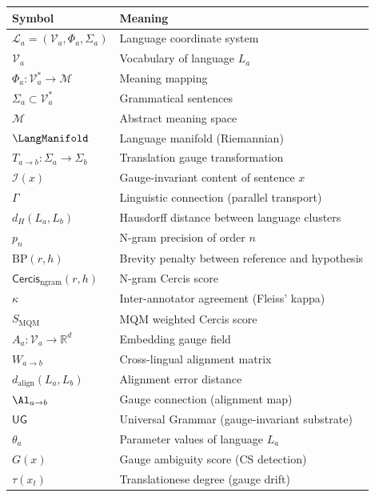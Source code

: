 \documentclass[12pt,a4paper]{article}
\theoremstyle{remark}
\newcommand{\R}{\mathbb{R}}
\newcommand{\M}{\mathcal{M}}
\newcommand{\I}{\mathcal{I}}
\newcommand{\Lang}{\mathcal{L}}
\newcommand{\Vocab}{\mathcal{V}}
\newcommand{\Cercis}{\textsf{Cercis}}
\newcommand{\UG}{\textsf{UG}}
\begin{document}
\begin{table}[H]
\centering
\begin{tabular}{@{}ll@{}}
\toprule
\textbf{Symbol} & \textbf{Meaning} \\
\midrule
$\Lang_a = (\Vocab_a, \Phi_a, \Sigma_a)$ & Language coordinate system \\
$\Vocab_a$ & Vocabulary of language $L_a$ \\
$\Phi_a: \Vocab_a^* \to \M$ & Meaning mapping \\
$\Sigma_a \subset \Vocab_a^*$ & Grammatical sentences \\
$\M$ & Abstract meaning space \\
$\LangManifold$ & Language manifold (Riemannian) \\
$T_{a\to b}: \Sigma_a \to \Sigma_b$ & Translation gauge transformation \\
$\I(x)$ & Gauge-invariant content of sentence $x$ \\
$\Gamma$ & Linguistic connection (parallel transport) \\
$d_H(L_a, L_b)$ & Hausdorff distance between language clusters \\
\midrule
$p_n$ & N-gram precision of order $n$ \\
$\text{BP}(r, h)$ & Brevity penalty between reference and hypothesis \\
$\Cercis_{\text{ngram}}(r, h)$ & N-gram Cercis score \\
$\kappa$ & Inter-annotator agreement (Fleiss' kappa) \\
$S_{\text{MQM}}$ & MQM weighted Cercis score \\
\midrule
$A_a: \Vocab_a \to \R^d$ & Embedding gauge field \\
$W_{a\to b}$ & Cross-lingual alignment matrix \\
$d_{\text{align}}(L_a, L_b)$ & Alignment error distance \\
$\Al_{a\to b}$ & Gauge connection (alignment map) \\
\midrule
$\UG$ & Universal Grammar (gauge-invariant substrate) \\
$\theta_a$ & Parameter values of language $L_a$ \\
$G(x)$ & Gauge ambiguity score (CS detection) \\
$\tau(x_t)$ & Translationese degree (gauge drift) \\
\bottomrule
\end{tabular}
\end{table}


\end{document}

